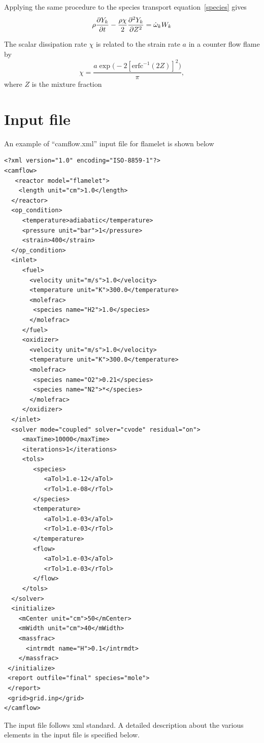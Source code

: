 Applying the same procedure to the species transport equation~\ref{species} gives
\begin{equation}
 \rho \frac{\partial {Y_k}}{\partial t } - \frac{\rho \chi}{2}\frac{\partial {^2Y_k}}{\partial {Z^2} } = \dot{\omega}_k W_k
\end{equation}

The scalar dissipation rate $\chi$ is related to the strain rate $a$ in a counter flow flame by
\begin{equation}
 \chi = \frac{a \exp \bigg( -2[\mathrm{erfc}^{-1}(2Z)]^2 \bigg)} {\pi},
\end{equation}
where $Z$ is the mixture fraction

 \section{Input file}
An example of ``camflow.xml'' input file for flamelet is shown below
{\scriptsize{
\begin{verbatim}
<?xml version="1.0" encoding="ISO-8859-1"?>
<camflow>
   <reactor model="flamelet">
    <length unit="cm">1.0</length>
  </reactor>
  <op_condition>
     <temperature>adiabatic</temperature>
     <pressure unit="bar">1</pressure>
     <strain>400</strain>
  </op_condition>
  <inlet>
     <fuel>
       <velocity unit="m/s">1.0</velocity>
       <temperature unit="K">300.0</temperature>
       <molefrac>
        <species name="H2">1.0</species>
       </molefrac>
     </fuel>
     <oxidizer>
       <velocity unit="m/s">1.0</velocity>
       <temperature unit="K">300.0</temperature>
       <molefrac>
        <species name="O2">0.21</species>
        <species name="N2">*</species>
       </molefrac>
     </oxidizer>
  </inlet>
  <solver mode="coupled" solver="cvode" residual="on">
     <maxTime>10000</maxTime>
     <iterations>1</iterations>
     <tols>
        <species>
           <aTol>1.e-12</aTol>
           <rTol>1.e-08</rTol>
        </species>
        <temperature>
           <aTol>1.e-03</aTol>
           <rTol>1.e-03</rTol>
        </temperature>
        <flow>
           <aTol>1.e-03</aTol>
           <rTol>1.e-03</rTol>
        </flow>
     </tols>
  </solver>
  <initialize>
    <mCenter unit="cm">50</mCenter>
    <mWidth unit="cm">40</mWidth>
    <massfrac>
      <intrmdt name="H">0.1</intrmdt>
    </massfrac>    
 </initialize>
 <report outfile="final" species="mole">
 </report>
 <grid>grid.inp</grid>
</camflow>

\end{verbatim}}
}

The input file follows xml standard. A detailed description about the various elements in the input file is specified below.

